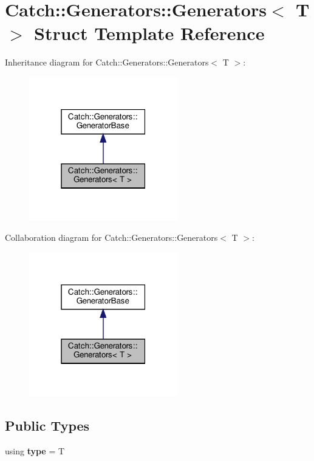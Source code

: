 \hypertarget{structCatch_1_1Generators_1_1Generators}{}\section{Catch\+::Generators\+::Generators$<$ T $>$ Struct Template Reference}
\label{structCatch_1_1Generators_1_1Generators}


Inheritance diagram for Catch\+::Generators\+::Generators$<$ T $>$\+:\nopagebreak
\begin{figure}[H]
\begin{center}
\leavevmode
\includegraphics[width=183pt]{structCatch_1_1Generators_1_1Generators__inherit__graph}
\end{center}
\end{figure}


Collaboration diagram for Catch\+::Generators\+::Generators$<$ T $>$\+:\nopagebreak
\begin{figure}[H]
\begin{center}
\leavevmode
\includegraphics[width=183pt]{structCatch_1_1Generators_1_1Generators__coll__graph}
\end{center}
\end{figure}
\subsection*{Public Types}
\begin{DoxyCompactItemize}
\item 
\mbox{\label{structCatch_1_1Generators_1_1Generators_aab27f98a577b49532b2ca7556a84286b}} 
using {\bfseries type} = T
\end{DoxyCompactItemize}
